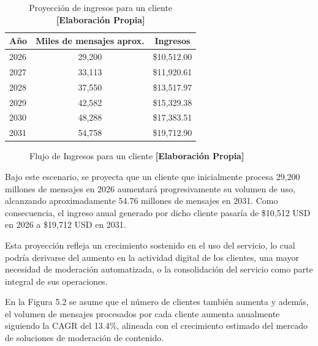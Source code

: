 \vspace{0.5cm}

\begin{table}[h!]
    \centering
    \begin{tabular}{l c c}
        \hline
        \textbf{Año} & \textbf{Miles de mensajes aprox.} & \textbf{Ingresos} \\
        \hline
        2026 & 29,200 & \$10,512.00 \\
        2027 & 33,113 & \$11,920.61 \\
        2028 & 37,550 & \$13,517.97 \\
        2029 & 42,582 & \$15,329.38 \\
        2030 & 48,288 & \$17,383.51 \\
        2031 & 54,758 & \$19,712.90 \\
        \hline
    \end{tabular}
    \caption{Proyección de ingresos para un cliente \textbf{[Elaboración Propia]}}
\end{table}

\begin{figure}[h!]
    \centering
    \caption{Flujo de Ingresos para un cliente \textbf{[Elaboración Propia]}}
\end{figure}

Bajo este escenario, se proyecta que un cliente que inicialmente procesa 29,200 millones de mensajes en 2026 aumentará progresivamente su volumen de uso, alcanzando aproximadamente 54.76 millones de mensajes en 2031. Como consecuencia, el ingreso anual generado por dicho cliente pasaría de \$10,512 USD en 2026 a \$19,712 USD en 2031.

Esta proyección refleja un crecimiento sostenido en el uso del servicio, lo cual podría derivarse del aumento en la actividad digital de los clientes, una mayor necesidad de moderación automatizada, o la consolidación del servicio como parte integral de sus operaciones.

En la Figura 5.2 se asume que el número de clientes también aumenta y además, el volumen de mensajes procesados por cada cliente aumenta anualmente siguiendo la CAGR del 13.4\%, alineada con el crecimiento estimado del mercado de soluciones de moderación de contenido.








\vspace{0.5cm}

